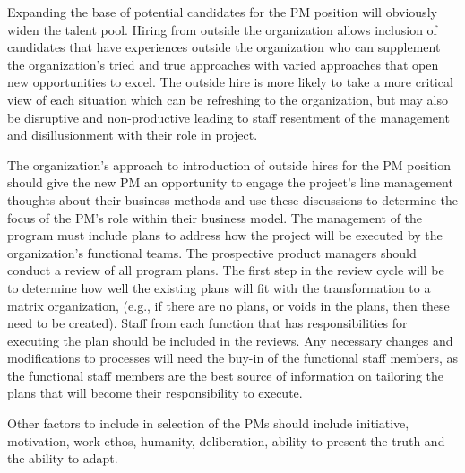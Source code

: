 \documentclass[letterpaper,10pt]{article}
\begin{document}
Expanding the base of potential candidates for the PM position will obviously widen the talent pool.  Hiring from outside the organization allows inclusion of candidates that have experiences outside the organization who can supplement the organization's tried and true approaches with varied approaches that open new opportunities to excel.  The outside hire is more likely to take a more critical view of each situation which can be refreshing to the organization, but may also be disruptive and non-productive leading to staff resentment of the management and disillusionment with their role in project.  

The organization's approach to introduction of outside hires for the PM position should give the new PM an opportunity to engage the project's line management thoughts about their business methods and use these discussions to determine the focus of the PM's role within their business model.  The management of the program must include plans to address how the project will be executed by the organization's functional teams.  The prospective product managers should conduct a review of all program plans.  The first step in the review cycle will be to determine how well the existing plans will fit with the transformation to a matrix organization, (e.g., if there are no plans, or voids in the plans, then these need to be created).  Staff from each function that has responsibilities for executing the plan should be included in the reviews.  Any necessary changes and modifications to processes will need the buy-in of the functional staff members, as the functional staff members are the best source of information on tailoring the plans that will become their responsibility to execute.

Other factors to include in selection of the PMs should include initiative, motivation, work ethos, humanity, deliberation, ability to present the truth and the ability to adapt.
\end{document}
